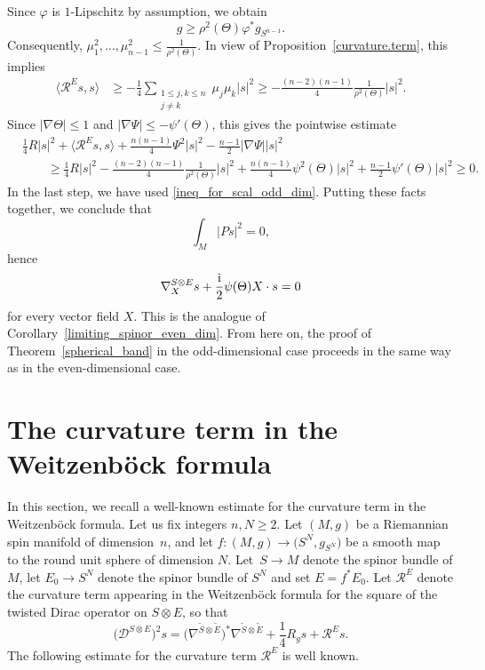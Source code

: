 \documentclass[11pt]{article}
\numberwithin{equation}{section}
\numberwithin{equation}{section}
\begin{document}
Since $\varphi$ is $1$-Lipschitz by assumption, we obtain
\[
 g \geq \rho^2(\Theta) \varphi^* g_{S^{n-1}} .
 \]
Consequently, $\mu_1^2,\hdots,\mu_{n-1}^2 \leq \frac{1}{\rho^2(\Theta)}$. In view of Proposition~\ref{curvature.term}, this implies
\begin{align*}
\big\langle \mathcal{R}^{E} s,s \big\rangle
&\geq -\frac{1}{4} \sum_{\substack{1 \leq j,k \leq n\\ j \neq k}} \mu_j \mu_k |s|^2 \geq -\frac{(n-2)(n-1)}{4} \frac{1}{\rho^2(\Theta)} |s|^2.
\end{align*}
Since $|\nabla \Theta| \leq 1$ and $|\nabla \Psi| \leq -\psi'(\Theta)$, this gives the pointwise estimate
\begin{align*}
&\frac{1}{4} R |s|^2 + \big\langle \mathcal{R}^{E} s,s \big\rangle + \frac{n(n-1)}{4} \Psi^2 |s|^2 - \frac{n-1}{2} |\nabla \Psi| |s|^2 \\
&\qquad\geq \frac{1}{4} R |s|^2 - \frac{(n-2)(n-1)}{4} \frac{1}{\rho^2(\Theta)} |s|^2
+ \frac{n(n-1)}{4} \psi^2(\Theta) |s|^2 + \frac{n-1}{2} \psi'(\Theta) |s|^2 \geq 0.
\end{align*}
In the last step, we have used \eqref{ineq_for_scal_odd_dim}.
Putting these facts together, we conclude that
\[
\int_M | P s|^2 = 0,
\]
hence
\[
 \nabla_X^{S \otimes E} s + \frac{\rm i}{2} \psi(\Theta) X \cdot s = 0
\]
for every vector field $X$.
This is the analogue of Corollary~\ref{limiting_spinor_even_dim}.
From here on, the proof of Theorem~\ref{spherical_band} in the odd-dimensional case proceeds in the same way as in the even-dimensional case.


\appendix

\appendix
\section{The curvature term in the Weitzenb\"ock formula}\label{appendix:Weitzen}

In this section, we recall a well-known estimate for the curvature term in the Weitzenb\"ock formula. Let us fix integers $n,N \geq 2$. Let $(M,g)$ be a Riemannian spin manifold of dimension~$n$, and let $f\colon (M,g) \to \big(S^N,g_{S^N}\big)$ be a smooth map to the round unit sphere of dimension $N$. Let~${S \to M}$ denote the spinor bundle of $M$, let $E_0 \to S^N$ denote the spinor bundle of $S^N$ and set $E = f^* E_0$. Let $\mathcal{R}^E$ denote the curvature term appearing in the Weitzenb\"ock formula for the square of the twisted Dirac operator on $S \otimes E$, so that
\[
\big(\mathcal{D}^{S \otimes E }\big)^2 s = \big(\nabla^{\tilde{S} \otimes \tilde{E}}\big)^*\nabla^{\tilde{S} \otimes \tilde{E}} + \frac{1}{4} R_g s + \mathcal{R}^{E} s.
\]
The following estimate for the curvature term $\mathcal{R}^E$ is well known.
\end{document}

